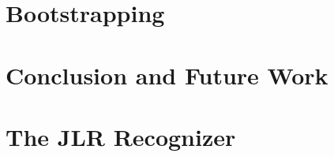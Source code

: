 \documentclass[nonatbib,preprint,numbers]{sigplanconf}
\begin{document}
\section{Bootstrapping \Fajita}
\label{Section:bootstrapping}


\section{Conclusion and Future Work}
\label{Section:zz}



\small


\clearpage
\appendix
\section{The JLR Recognizer}

\end{document}
